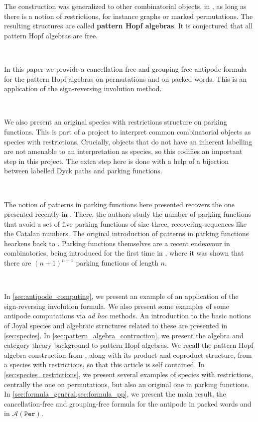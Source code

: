 \documentclass[12pt, reqno]{amsart}
\theoremstyle{definition}
\begin{document}
The construction was generalized to other combinatorial objects, in \cite{Penaguiao2020}, as long as there is a notion of restrictions, for instance graphs or marked permutations.
The resulting structures are called \textbf{pattern Hopf algebras}.
It is conjectured that all pattern Hopf algebras are free.

\

In this paper we provide a cancellation-free and grouping-free antipode formula for the pattern Hopf algebras on permutations and on packed words.
This is an application of the sign-reversing involution method.

\

We also present an original species with restrictions structure on parking functions.
This is part of a project to interpret common combinatorial objects as species with restrictions.
Crucially, objects that do not have an inherent labelling are not amenable to an interpretation as species, so this codifies an important step in this project.
The extra step here is done with a help of a bijection between labelled Dyck paths and parking functions.

\

The notion of patterns in parking functions here presented recovers the one presented recently in \cite{adeniran2022pattern}.
There, the authors study the number of parking functions that avoid a set of five parking functions of size three, recovering sequences like the Catalan numbers.
The original introduction of patterns in parking functions hearkens back to \cite{qiu2018patterns}.
Parking functions themselves are a recent endeavour in combinatorics, being introduced for the first time in \cite{konheim1966occupancy}, where it was shown that there are $(n+1)^{n-1}$ parking functions of length $n$.

\

In \cref{sec:antipode_computing}, we present an example of an application of the sign-reversing involution formula.
We also present some examples of some antipode computations via \textit{ad hoc} methods. An introduction to the basic notions of Joyal species and algebraic structures related to these are presented in \cref{sec:species}. In \cref{sec:pattern_algebra_contruction}, we present the algebra and category theory background to pattern Hopf algebras. We recall the pattern Hopf algebra construction from \cite{Penaguiao2020}, along with its product and coproduct structure, from a species with restrictions, so that this article is self contained.
In \cref{sec:species_restrictions}, we present several examples of species with restrictions, centrally the one on permutations, but also an original one in parking functions.
In \cref{sec:formula_general,sec:formula_pp}, we present the main result, the cancellation-free and grouping-free formula for the antipode in packed words and in $\mathcal{A}(\mathtt{Per})$.
\end{document}
